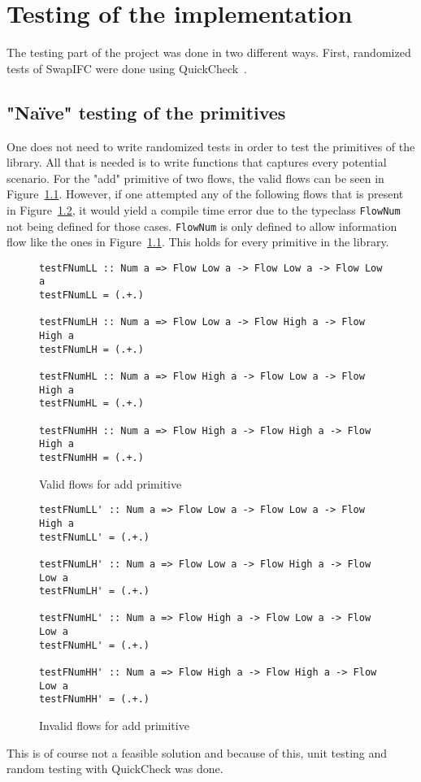 \chapter{Testing of the implementation}
\label{chapter:testing}
The testing part of the project was done in two different ways. First, randomized tests of SwapIFC were done using QuickCheck~\cite{quickcheck, quickcheck-wiki}.
\section{"Naïve" testing of the primitives}
One does not need to write randomized tests in order to test the primitives of the library. All that is needed is to write functions that captures every potential scenario. For the "add" primitive of two flows, the valid flows can be seen in Figure~\ref{fig:validFlow}.
However, if one attempted any of the following flows that is present in Figure~\ref{fig:invalidFlow}, it would yield a compile time error due to the typeclass {\tt FlowNum} not being defined for those cases. {\tt FlowNum} is only defined to allow information flow like the ones in Figure~\ref{fig:validFlow}. This holds for every primitive in the library.
\begin{figure}[h]
\begin{verbatim}
testFNumLL :: Num a => Flow Low a -> Flow Low a -> Flow Low a
testFNumLL = (.+.)
  
testFNumLH :: Num a => Flow Low a -> Flow High a -> Flow High a
testFNumLH = (.+.)
    
testFNumHL :: Num a => Flow High a -> Flow Low a -> Flow High a
testFNumHL = (.+.)
    
testFNumHH :: Num a => Flow High a -> Flow High a -> Flow High a
testFNumHH = (.+.)
\end{verbatim}
\caption{Valid flows for add primitive}
\label{fig:validFlow}
\end{figure}
\begin{figure}[h]
\begin{verbatim}
testFNumLL' :: Num a => Flow Low a -> Flow Low a -> Flow High a
testFNumLL' = (.+.)
  
testFNumLH' :: Num a => Flow Low a -> Flow High a -> Flow Low a
testFNumLH' = (.+.)

testFNumHL' :: Num a => Flow High a -> Flow Low a -> Flow Low a
testFNumHL' = (.+.)

testFNumHH' :: Num a => Flow High a -> Flow High a -> Flow Low a
testFNumHH' = (.+.)
\end{verbatim}
\caption{Invalid flows for add primitive}
\label{fig:invalidFlow}
\end{figure}
This is of course not a feasible solution and because of this, unit testing and random testing with QuickCheck was done.

